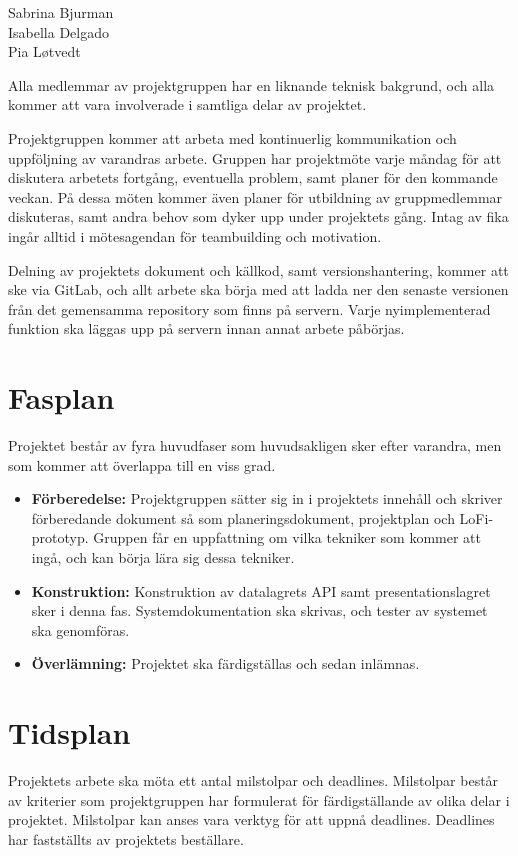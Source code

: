 \documentclass{TDP003mall}
\begin{document}
Sabrina Bjurman\\
Isabella Delgado\\
Pia Løtvedt

Alla medlemmar av projektgruppen har en liknande teknisk bakgrund, och alla kommer att vara involverade i samtliga delar av projektet.

Projektgruppen kommer att arbeta med kontinuerlig kommunikation och uppföljning av varandras arbete. Gruppen har projektmöte varje måndag för att diskutera arbetets fortgång, eventuella problem, samt planer för den kommande veckan. På dessa möten kommer även planer för utbildning av gruppmedlemmar diskuteras, samt andra behov som dyker upp under projektets gång. Intag av fika ingår alltid i mötesagendan för teambuilding och motivation.

Delning av projektets dokument och källkod, samt versionshantering, kommer att ske via GitLab, och allt arbete ska börja med att ladda ner den senaste versionen från det gemensamma repository som finns på servern. Varje nyimplementerad funktion ska läggas upp på servern innan annat arbete påbörjas.

\pagebreak
\section{Fasplan}
Projektet består av fyra huvudfaser som huvudsakligen sker efter varandra, men som kommer att överlappa till en viss grad.
\begin{itemize}
\item \textbf{Förberedelse:} Projektgruppen sätter sig in i projektets innehåll och skriver förberedande dokument så som planeringsdokument, projektplan och LoFi-prototyp. Gruppen får en uppfattning om vilka tekniker som kommer att ingå, och kan börja lära sig dessa tekniker.
\item \textbf{Konstruktion:} Konstruktion av datalagrets API samt presentationslagret sker i denna fas. Systemdokumentation ska skrivas, och tester av systemet ska genomföras.
\item \textbf{Överlämning:} Projektet ska färdigställas och sedan inlämnas.
\end{itemize}

\pagebreak
\section{Tidsplan}
Projektets arbete ska möta ett antal milstolpar och deadlines. Milstolpar består av kriterier som projektgruppen har formulerat för färdigställande av olika delar i projektet. Milstolpar kan anses vara verktyg för att uppnå deadlines. Deadlines har fastställts av projektets beställare.
\end{document}
